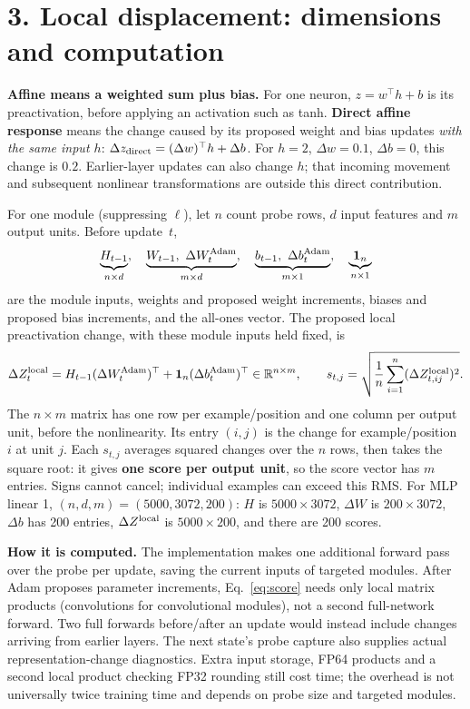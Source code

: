\documentclass[11pt,a4paper]{article}
\newcommand{\R}{\mathbb R}
\newcommand{\sect}[1]{\vspace{2pt}\section*{#1}\vspace{-4pt}}
\begin{document}
\sect{3. Local displacement: dimensions and computation}
\textbf{Affine means a weighted sum plus bias.} For one neuron, $z=w^\top h+b$
is its preactivation, before applying an activation such as tanh.
\textbf{Direct affine response} means the change caused by its proposed weight
and bias updates \emph{with the same input $h$}:
$\Delta z_{\rm direct}=(\Delta w)^\top h+\Delta b$.
For $h=2$, $\Delta w=0.1$, $\Delta b=0$, this change is $0.2$.
Earlier-layer updates can also change $h$; that incoming movement
and subsequent nonlinear transformations are outside this direct contribution.

For one module (suppressing $\ell$), let $n$ count probe rows, $d$ input
features and $m$ output units. Before update~$t$,
\begin{equation*}
 \underbrace{H_{t-1}}_{n\times d},\quad
 \underbrace{W_{t-1},\ \Delta W_t^{\rm Adam}}_{m\times d},\quad
 \underbrace{b_{t-1},\ \Delta b_t^{\rm Adam}}_{m\times1},\quad
 \underbrace{\mathbf1_n}_{n\times1}
\end{equation*}
are the module inputs, weights and proposed weight increments, biases and
proposed bias increments, and the all-ones vector. The proposed local
preactivation change, with these module inputs held fixed, is
\begin{equation}
 \Delta Z_t^{\rm local}
 =H_{t-1}(\Delta W_t^{\rm Adam})^\top
   +\mathbf1_n(\Delta b_t^{\rm Adam})^\top\in\R^{n\times m},\qquad
 s_{t,j}=\sqrt{\frac1n\sum_{i=1}^n(\Delta Z_{t,ij}^{\rm local})^2}.
 \label{eq:score}
\end{equation}
The $n\times m$ matrix has one row per example/position and one column per
output unit, before the nonlinearity. Its entry $(i,j)$ is the change for
example/position $i$ at unit $j$. Each $s_{t,j}$ averages squared changes over
the $n$ rows, then takes the square root: it gives \textbf{one score per output
unit}, so the score vector has $m$ entries. Signs cannot cancel; individual
examples can exceed this RMS. For MLP linear 1, $(n,d,m)=(5000,3072,200)$:
$H$ is $5000\times3072$, $\Delta W$ is $200\times3072$, $\Delta b$ has 200
entries, $\Delta Z^{\rm local}$ is $5000\times200$, and there are 200 scores.

\textbf{How it is computed.} The implementation makes one additional forward
pass over the probe per update, saving the current inputs of targeted modules.
After Adam proposes parameter increments, Eq.~\eqref{eq:score} needs only local
matrix products (convolutions for convolutional modules), not a second full-network
forward. Two full forwards before/after an update would instead include changes
arriving from earlier layers. The next state's probe capture also supplies actual
representation-change diagnostics. Extra input storage, FP64 products and a
second local product checking FP32 rounding still cost time; the overhead is not
universally twice training time and depends on probe size and targeted modules.
\end{document}

